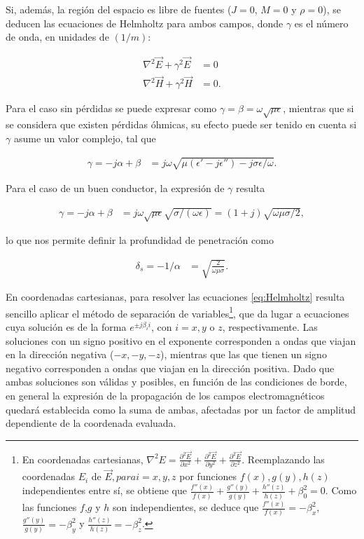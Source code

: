 Si, además, la región del espacio es libre de fuentes ($J=0$, $M=0$ y $\rho=0$), se deducen las ecuaciones de Helmholtz para ambos campos, donde $\gamma$ es el número de onda, en unidades de $(1/m)$:

\begin{equation}
	\label{eq:Helmholtz}
	\begin{aligned}
		\nabla^2  \vec{E} + \gamma^2 \vec{E} &= 0  \\
		\nabla^2 \vec{H} + \gamma^2 \vec{H}& = 0. 
	\end{aligned}
\end{equation}

Para el caso sin pérdidas se puede expresar como $\gamma = \beta = \omega \sqrt{\mu \epsilon}$, mientras que si se considera que existen pérdidas óhmicas,  su efecto puede ser tenido en cuenta si  $\gamma$ asume un valor complejo, tal que

\begin{align}
\label{eq:constante-propagacion-compleja}
\gamma = -j\alpha + \beta &= j\omega \sqrt{\mu (\epsilon'-j\epsilon'') - j \sigma \epsilon/\omega}.
\end{align}

Para el caso de un buen conductor, la expresión de $\gamma$ resulta

\begin{align}
\gamma = -j\alpha + \beta &= j \omega \sqrt{\mu \epsilon} \sqrt{\sigma/(\omega \epsilon)} = (1+j) \sqrt{\omega \mu \sigma/2},
\end{align}

lo que nos permite definir la profundidad de penetración como 

\begin{align}
\label{eq:prof_penetacion}
\delta_s = -1/\alpha &= \sqrt{\frac{2}{\omega \mu \sigma}}.
\end{align}

En coordenadas cartesianas, para resolver las ecuaciones \ref{eq:Helmholtz} resulta sencillo aplicar el método de separación de variables\footnote{En coordenadas cartesianas, $\nabla^2 E = \frac{\partial^2 \vec{E}}{\partial x^2} + \frac{\partial^2 \vec{E}}{\partial y^2} + \frac{\partial^2 \vec{E}}{\partial z^2}$. Reemplazando las coordenadas $E_i$ de $\vec{E}, para i=x,y,z$ por funciones $f(x),g(y),h(z)$ independientes entre sí, se obtiene que $\frac{f''(x)}{f(x)} + \frac{g''(y)}{g(y)} + \frac{h''(z)}{h(z)} + \beta_0^2 = 0$. Como las funciones $f$,$g$ y $h$ son independientes, se deduce que $\frac{f''(x)}{f(x)} = -\beta_x^2$, $\frac{g''(y)}{g(y)} = -\beta_y^2$ y $\frac{h''(z)}{h(z)} = -\beta_z^2$.}, que da lugar a ecuaciones cuya solución es de la forma $e^{\pm j \beta_i i}$, con $i = x, y$ o $z$, respectivamente. Las soluciones con un signo positivo en el exponente corresponden a ondas que viajan en la dirección negativa ($-x, -y, -z$), mientras que las que tienen un signo negativo corresponden a ondas que viajan en la dirección positiva. Dado que ambas soluciones son válidas y posibles, en función de las condiciones de borde, en general la expresión de la propagación de los campos electromagnéticos quedará establecida como la suma de ambas, afectadas por un factor de amplitud dependiente de la coordenada evaluada.

